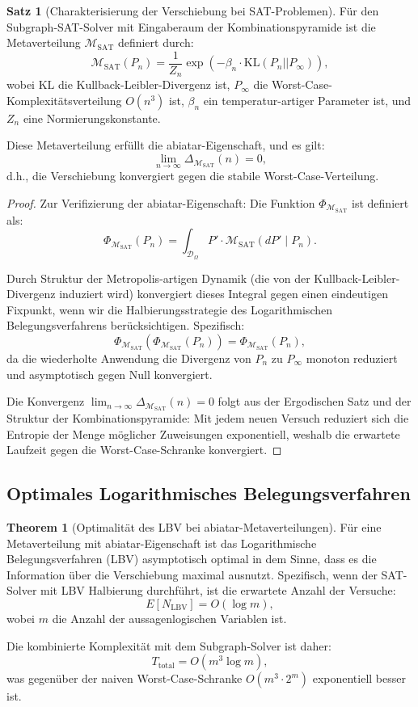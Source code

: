 \documentclass[a4paper,12pt]{article}
\theoremstyle{definition}
\newtheorem{satz}{Satz}
\newtheorem{theorem}{Theorem}
\begin{document}
\begin{satz}[Charakterisierung der Verschiebung bei SAT-Problemen]
\label{satz:sat_verschiebung}
Für den Subgraph-SAT-Solver mit Eingaberaum der Kombinationspyramide ist die Metaverteilung $\mathcal{M}_{\text{SAT}}$ definiert durch:
\[
\mathcal{M}_{\text{SAT}}(P_n) = \frac{1}{Z_n} \exp\left( -\beta_n \cdot \text{KL}(P_n || P_{\infty}) \right),
\]
wobei $\text{KL}$ die Kullback-Leibler-Divergenz ist, $P_{\infty}$ die Worst-Case-Komplexitätsverteilung $O(n^3)$ ist, $\beta_n$ ein temperatur-artiger Parameter ist, und $Z_n$ eine Normierungskonstante.

Diese Metaverteilung erfüllt die abiatar-Eigenschaft, und es gilt:
\[
\lim_{n \to \infty} \Delta_{\mathcal{M}_{\text{SAT}}}(n) = 0,
\]
d.h., die Verschiebung konvergiert gegen die stabile Worst-Case-Verteilung.
\end{satz}

\begin{proof}
Zur Verifizierung der abiatar-Eigenschaft: Die Funktion $\Phi_{\mathcal{M}_{\text{SAT}}}$ ist definiert als:
\[
\Phi_{\mathcal{M}_{\text{SAT}}}(P_n) = \int_{\mathcal{D}_\Omega} P' \cdot \mathcal{M}_{\text{SAT}}(dP' \mid P_n).
\]

Durch Struktur der Metropolis-artigen Dynamik (die von der Kullback-Leibler-Divergenz induziert wird) konvergiert dieses Integral gegen einen eindeutigen Fixpunkt, wenn wir die Halbierungsstrategie des Logarithmischen Belegungsverfahrens berücksichtigen. Spezifisch:
\[
\Phi_{\mathcal{M}_{\text{SAT}}}(\Phi_{\mathcal{M}_{\text{SAT}}}(P_n)) = \Phi_{\mathcal{M}_{\text{SAT}}}(P_n),
\]
da die wiederholte Anwendung die Divergenz von $P_n$ zu $P_{\infty}$ monoton reduziert und asymptotisch gegen Null konvergiert.

Die Konvergenz $\lim_{n \to \infty} \Delta_{\mathcal{M}_{\text{SAT}}}(n) = 0$ folgt aus der Ergodischen Satz und der Struktur der Kombinationspyramide: Mit jedem neuen Versuch reduziert sich die Entropie der Menge möglicher Zuweisungen exponentiell, weshalb die erwartete Laufzeit gegen die Worst-Case-Schranke konvergiert. 
\end{proof}

\subsection{Optimales Logarithmisches Belegungsverfahren}

\begin{theorem}[Optimalität des LBV bei abiatar-Metaverteilungen]
\label{thm:lbv_optimal}
Für eine Metaverteilung mit abiatar-Eigenschaft ist das Logarithmische Belegungsverfahren (LBV) asymptotisch optimal in dem Sinne, dass es die Information über die Verschiebung maximal ausnutzt. Spezifisch, wenn der SAT-Solver mit LBV Halbierung durchführt, ist die erwartete Anzahl der Versuche:
\[
E[N_{\text{LBV}}] = O(\log m),
\]
wobei $m$ die Anzahl der aussagenlogischen Variablen ist.

Die kombinierte Komplexität mit dem Subgraph-Solver ist daher:
\[
T_{\text{total}} = O(m^3 \log m),
\]
was gegenüber der naiven Worst-Case-Schranke $O(m^3 \cdot 2^m)$ exponentiell besser ist.
\end{theorem}
\end{document}
